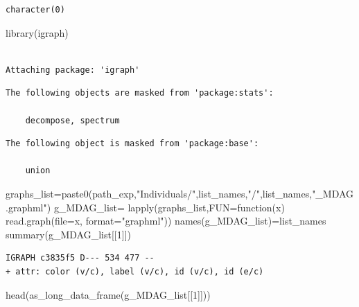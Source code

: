 \documentclass[
  letterpaper,
  DIV=11,
  numbers=noendperiod]{scrreprt}
\newenvironment{Shaded}{\begin{snugshade}}{\end{snugshade}}
\newcommand{\AttributeTok}[1]{\textcolor[rgb]{0.40,0.45,0.13}{#1}}
\newcommand{\ControlFlowTok}[1]{\textcolor[rgb]{0.00,0.23,0.31}{#1}}
\newcommand{\DecValTok}[1]{\textcolor[rgb]{0.68,0.00,0.00}{#1}}
\newcommand{\FunctionTok}[1]{\textcolor[rgb]{0.28,0.35,0.67}{#1}}
\newcommand{\NormalTok}[1]{\textcolor[rgb]{0.00,0.23,0.31}{#1}}
\newcommand{\OtherTok}[1]{\textcolor[rgb]{0.00,0.23,0.31}{#1}}
\newcommand{\StringTok}[1]{\textcolor[rgb]{0.13,0.47,0.30}{#1}}
\begin{document}
\begin{verbatim}
character(0)
\end{verbatim}

\begin{Shaded}
\begin{Highlighting}[]
\FunctionTok{library}\NormalTok{(igraph)}
\end{Highlighting}
\end{Shaded}

\begin{verbatim}

Attaching package: 'igraph'
\end{verbatim}

\begin{verbatim}
The following objects are masked from 'package:stats':

    decompose, spectrum
\end{verbatim}

\begin{verbatim}
The following object is masked from 'package:base':

    union
\end{verbatim}

\begin{Shaded}
\begin{Highlighting}[]
\NormalTok{graphs\_list}\OtherTok{=}\FunctionTok{paste0}\NormalTok{(path\_exp,}\StringTok{"Individuals/"}\NormalTok{,list\_names,}\StringTok{"/"}\NormalTok{,list\_names,}\StringTok{"\_MDAG.graphml"}\NormalTok{)}
\NormalTok{g\_MDAG\_list}\OtherTok{=}
  \FunctionTok{lapply}\NormalTok{(graphs\_list,}\AttributeTok{FUN=}\ControlFlowTok{function}\NormalTok{(x) }\FunctionTok{read.graph}\NormalTok{(}\AttributeTok{file=}\NormalTok{x,}
                    \AttributeTok{format=}\StringTok{"graphml"}\NormalTok{))}
\FunctionTok{names}\NormalTok{(g\_MDAG\_list)}\OtherTok{=}\NormalTok{list\_names}
\FunctionTok{summary}\NormalTok{(g\_MDAG\_list[[}\DecValTok{1}\NormalTok{]])}
\end{Highlighting}
\end{Shaded}

\begin{verbatim}
IGRAPH c3835f5 D--- 534 477 -- 
+ attr: color (v/c), label (v/c), id (v/c), id (e/c)
\end{verbatim}

\begin{Shaded}
\begin{Highlighting}[]
\FunctionTok{head}\NormalTok{(}\FunctionTok{as\_long\_data\_frame}\NormalTok{(g\_MDAG\_list[[}\DecValTok{1}\NormalTok{]]))}
\end{Highlighting}
\end{Shaded}
\end{document}
